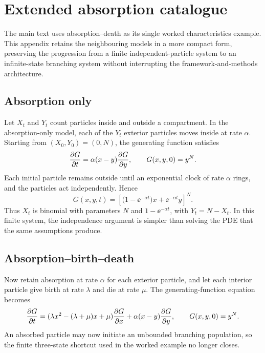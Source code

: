 \chapter{Extended absorption catalogue}\label{m:app:extended-absorption}

The main text uses absorption--death as its single worked characteristics example.
This appendix retains the neighbouring models in a more compact form, preserving
the progression from a finite independent-particle system to an infinite-state
branching system without interrupting the framework-and-methods architecture.

\section{Absorption only}\label{m:app:absorption-only}

Let $X_t$ and $Y_t$ count particles inside and outside a compartment.  In the
absorption-only model, each of the $Y_t$ exterior particles moves inside at rate
$\alpha$.  Starting from $(X_0,Y_0)=(0,N)$, the generating function satisfies
\begin{equation}
  \frac{\partial G}{\partial t}=\alpha(x-y)\frac{\partial G}{\partial y},
  \qquad G(x,y,0)=y^N.
  \label{m:eq:absorption-only-pde}
\end{equation}
Each initial particle remains outside until an exponential clock of rate $\alpha$
rings, and the particles act independently.  Hence
\begin{equation}
  G(x,y,t)=
  \left[\bigl(1-\ee^{-\alpha t}\bigr)x+\ee^{-\alpha t}y\right]^N.
  \label{m:eq:Gabsonly}
\end{equation}
Thus $X_t$ is binomial with parameters $N$ and $1-\ee^{-\alpha t}$, with
$Y_t=N-X_t$.  In this finite system, the independence argument is simpler than
solving the PDE that the same assumptions produce.

\section{Absorption--birth--death}\label{m:app:absorption-birth-death}

Now retain absorption at rate $\alpha$ for each exterior particle, and let each
interior particle give birth at rate $\lambda$ and die at rate $\mu$.  The
generating-function equation becomes
\begin{equation}
  \frac{\partial G}{\partial t}
  =(\lambda x^2-(\lambda+\mu)x+\mu)\frac{\partial G}{\partial x}
   +\alpha(x-y)\frac{\partial G}{\partial y},
  \qquad G(x,y,0)=y^N.
  \label{m:eq:abd-pde}
\end{equation}
An absorbed particle may now initiate an unbounded branching population, so the
finite three-state shortcut used in the worked example no longer closes.

